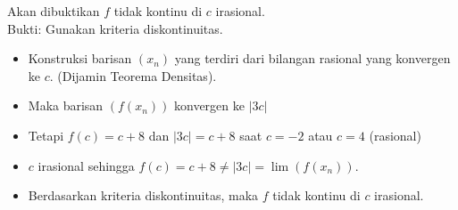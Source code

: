 \documentclass{article}
\begin{document}
\begin{enumerate}[leftmargin=*, label={\arabic*}.]
Akan dibuktikan $f$ tidak kontinu di $c$ irasional.\\
Bukti: Gunakan kriteria diskontinuitas.
\begin{itemize}
    \item Konstruksi barisan $(x_n)$ yang terdiri dari bilangan rasional yang konvergen ke $c$. (Dijamin Teorema Densitas).
    \item Maka barisan $(f(x_n))$ konvergen ke $|3c|$
    \item Tetapi $f(c) = c+8$ dan $|3c| = c+8$ saat $c=-2$ atau $c=4$ (rasional)
    \item $c$ irasional sehingga $f(c) = c+8 \neq |3c| = \lim(f(x_n))$.
    \item Berdasarkan kriteria diskontinuitas, maka $f$ tidak kontinu di $c$ irasional.
\end{itemize}
\end{enumerate}
\end{document}
